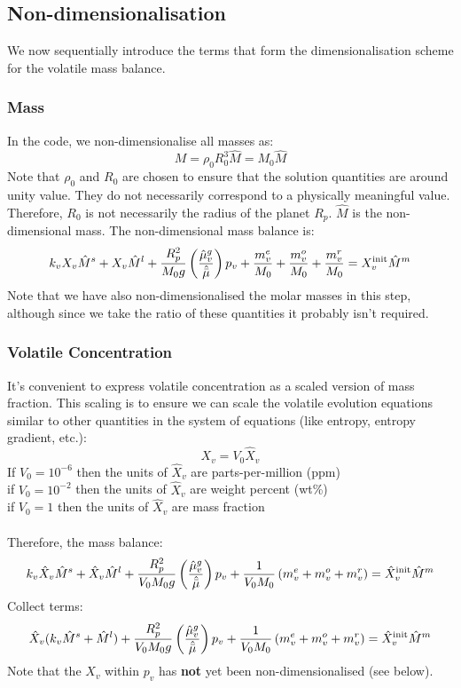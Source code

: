 \subsection{Non-dimensionalisation}
We now sequentially introduce the terms that form the dimensionalisation scheme for the volatile mass balance.
\subsubsection{Mass}
In the code, we non-dimensionalise all masses as:
\begin{equation}
M = \rho_0 R_0^3 \hat{M} = M_0 \hat{M}
\end{equation}
Note that $\rho_0$ and $R_0$ are chosen to ensure that the solution quantities are around unity value.  They do not necessarily correspond to a physically meaningful value.  Therefore, $R_0$ is not necessarily the radius of the planet $R_p$.  $\hat{M}$ is the non-dimensional mass.  The non-dimensional mass balance is:
\begin{equation}
k_v X_v \hat{M}^s + X_v \hat{M}^l + \frac{R_p^2}{M_0 g} \left( \frac{\hat{\mu}_v^g}{\hat{\bar{\mu}}} \right) p_v + \frac{m_v^e}{M_0} + \frac{m_v^o}{M_0} + \frac{m_v^r}{M_0} = X_v^{\rm init} \hat{M}^m
\end{equation}
Note that we have also non-dimensionalised the molar masses in this step, although since we take the ratio of these quantities it probably isn't required.
\subsubsection{Volatile Concentration}
It's convenient to express volatile concentration as a scaled version of mass fraction.  This scaling is to ensure we can scale the volatile evolution equations similar to other quantities in the system of equations (like entropy, entropy gradient, etc.):
\begin{equation}
X_v = V_0 \hat{X}_v
\end{equation}
If $V_0=10^{-6}$ then the units of $\hat{X}_v$ are parts-per-million (ppm)\\
if $V_0=10^{-2}$ then the units of $\hat{X}_v$ are weight percent (wt\%)\\
if $V_0=1$ then the units of $\hat{X}_v$ are mass fraction\\~\\
Therefore, the mass balance:
\begin{equation}
k_v \hat{X}_v \hat{M}^s + \hat{X}_v \hat{M}^l + \frac{R_p^2}{V_0 M_0 g} \left( \frac{\hat{\mu}_v^g}{\hat{\bar{\mu}}} \right) p_v + \frac{1}{V_0 M_0} \left( m_v^e + m_v^o + m_v^r \right) = \hat{X}_v^{\rm init} \hat{M}^m
\end{equation}
Collect terms:
\begin{equation}
\hat{X}_v (k_v \hat{M}^s + \hat{M}^l) + \frac{R_p^2}{V_0 M_0 g} \left( \frac{\hat{\mu}_v^g}{\hat{\bar{\mu}}} \right) p_v + \frac{1}{V_0 M_0} \left( m_v^e + m_v^o + m_v^r \right) = \hat{X}_v^{\rm init} \hat{M}^m
\end{equation}
Note that the $X_v$ within $p_v$ has \textbf{not} yet been non-dimensionalised (see below).
